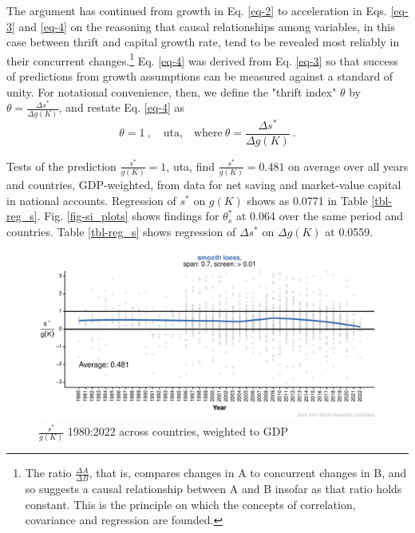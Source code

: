 \documentclass[a4paper,fleqn]{latex_styles/cas-sc}
\begin{document}
The argument has continued from growth in Eq. \eqref{eq-2} to acceleration in Eqs. \eqref{eq-3} and \eqref{eq-4} on the reasoning that causal relationships among variables, in this case between thrift and capital growth rate, tend to be revealed most reliably in their concurrent changes.\footnote{The ratio \(\frac{\Delta A}{\Delta B}\), that is, compares changes in A to concurrent changes in B, and so suggests a causal relationship between A and B insofar as that ratio holds constant. This is the principle on which the concepts of correlation, covariance and regression are founded.} Eq. \eqref{eq-4} was derived from Eq. \eqref{eq-3} so that success of predictions from growth assumptions can be measured against a standard of unity. For notational convenience, then, we define the "thrift index" \(\theta\) by \(\theta = \frac{\Delta s^*}{\Delta g(K)}\), and restate Eq. \eqref{eq-4} as
%
\begin{equation}
\theta = 1\ , \quad \text{uta,}\quad \text{where} \ \theta = \frac{\Delta s^*}{\Delta g(K)}\ . \label{eq-5}
\end{equation}
%

Tests of the prediction \(\frac{s^*}{g(K)} = 1\), uta, find \(\frac{s^*}{g(K)} = 0.481\) on average over all years and countries, GDP-weighted, from data for net saving and market-value capital in national accounts. Regression of \(s^*\) on \(g(K)\) shows as 0.0771 in Table \ref{tbl-reg_s}. Fig. \ref{fig-si_plots} shows findings for \(\theta^*_s\) at 0.064 over the same period and countries. Table \ref{tbl-reg_s} shows regression of \(\Delta s^*\) on \(\Delta g(K)\) at 0.0559.

\FloatBarrier
\begin{figure}[pos=H]
    \centering
        \includegraphics[width=1\textwidth]{./figure-pdf/fig-s_c_theta_plots-1.pdf}
    \captionsetup{justification=centering}
    \caption{\(\frac{s^*}{g(K)}\) 1980:2022 across countries, weighted to GDP} %
    \label{fig-s_c_theta_plots}
\end{figure}
%
%
\FloatBarrier

\FloatBarrier
%
\end{document}
